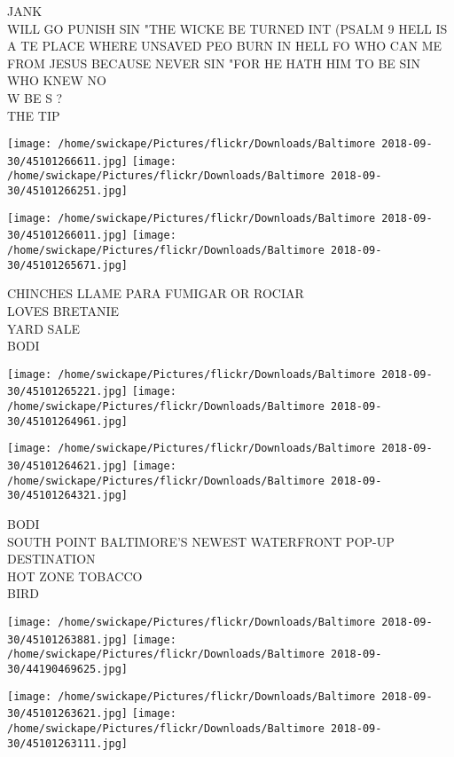 \documentclass[10pt,letterpaper]{article}
\begin{document}
JANK\\
WILL GO PUNISH SIN "THE WICKE BE TURNED INT (PSALM 9 HELL IS A TE PLACE WHERE UNSAVED PEO BURN IN HELL FO WHO CAN ME FROM JESUS BECAUSE NEVER SIN "FOR HE HATH HIM TO BE SIN WHO KNEW NO\\
W BE S ?\\
THE TIP\\
\pagebreak

\texttt{[image: /home/swickape/Pictures/flickr/Downloads/Baltimore 2018-09-30/45101266611.jpg]}
\texttt{[image: /home/swickape/Pictures/flickr/Downloads/Baltimore 2018-09-30/45101266251.jpg]}

\texttt{[image: /home/swickape/Pictures/flickr/Downloads/Baltimore 2018-09-30/45101266011.jpg]}
\texttt{[image: /home/swickape/Pictures/flickr/Downloads/Baltimore 2018-09-30/45101265671.jpg]}

CHINCHES LLAME PARA FUMIGAR OR ROCIAR\\
LOVES BRETANIE\\
YARD SALE\\
BODI\\
\pagebreak

\texttt{[image: /home/swickape/Pictures/flickr/Downloads/Baltimore 2018-09-30/45101265221.jpg]}
\texttt{[image: /home/swickape/Pictures/flickr/Downloads/Baltimore 2018-09-30/45101264961.jpg]}

\texttt{[image: /home/swickape/Pictures/flickr/Downloads/Baltimore 2018-09-30/45101264621.jpg]}
\texttt{[image: /home/swickape/Pictures/flickr/Downloads/Baltimore 2018-09-30/45101264321.jpg]}

BODI\\
SOUTH POINT BALTIMORE'S NEWEST WATERFRONT POP{-}UP DESTINATION\\
HOT ZONE TOBACCO\\
BIRD\\
\pagebreak

\texttt{[image: /home/swickape/Pictures/flickr/Downloads/Baltimore 2018-09-30/45101263881.jpg]}
\texttt{[image: /home/swickape/Pictures/flickr/Downloads/Baltimore 2018-09-30/44190469625.jpg]}

\texttt{[image: /home/swickape/Pictures/flickr/Downloads/Baltimore 2018-09-30/45101263621.jpg]}
\texttt{[image: /home/swickape/Pictures/flickr/Downloads/Baltimore 2018-09-30/45101263111.jpg]}
\end{document}
